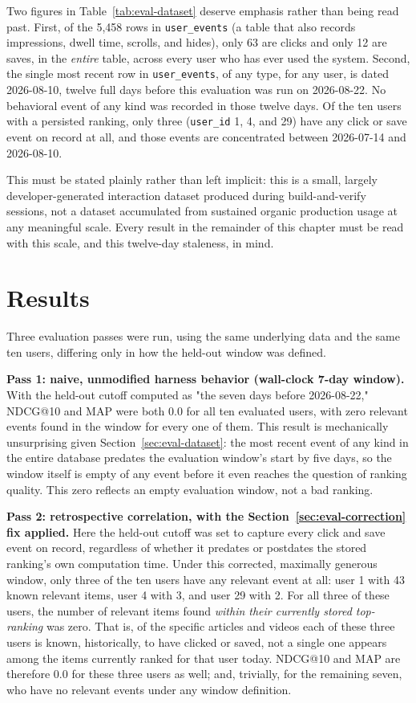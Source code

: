 Two figures in Table~\ref{tab:eval-dataset} deserve emphasis rather than being read past. First, of the 5,458 rows in \texttt{user\_events} (a table that also records impressions, dwell time, scrolls, and hides), only 63 are clicks and only 12 are saves, in the \emph{entire} table, across every user who has ever used the system. Second, the single most recent row in \texttt{user\_events}, of any type, for any user, is dated 2026-08-10, twelve full days before this evaluation was run on 2026-08-22. No behavioral event of any kind was recorded in those twelve days. Of the ten users with a persisted ranking, only three (\texttt{user\_id} 1, 4, and 29) have any click or save event on record at all, and those events are concentrated between 2026-07-14 and 2026-08-10.

This must be stated plainly rather than left implicit: this is a small, largely developer-generated interaction dataset produced during build-and-verify sessions, not a dataset accumulated from sustained organic production usage at any meaningful scale. Every result in the remainder of this chapter must be read with this scale, and this twelve-day staleness, in mind.

\section{Results}
\label{sec:eval-results}

Three evaluation passes were run, using the same underlying data and the same ten users, differing only in how the held-out window was defined.

\textbf{Pass 1: naive, unmodified harness behavior (wall-clock 7-day window).} With the held-out cutoff computed as "the seven days before 2026-08-22," NDCG@10 and MAP were both $0.0$ for all ten evaluated users, with zero relevant events found in the window for every one of them. This result is mechanically unsurprising given Section~\ref{sec:eval-dataset}: the most recent event of any kind in the entire database predates the evaluation window's start by five days, so the window itself is empty of any event before it even reaches the question of ranking quality. This zero reflects an empty evaluation window, not a bad ranking.

\textbf{Pass 2: retrospective correlation, with the Section~\ref{sec:eval-correction} fix applied.} Here the held-out cutoff was set to capture every click and save event on record, regardless of whether it predates or postdates the stored ranking's own computation time. Under this corrected, maximally generous window, only three of the ten users have any relevant event at all: user 1 with 43 known relevant items, user 4 with 3, and user 29 with 2. For all three of these users, the number of relevant items found \emph{within their currently stored top-ranking} was zero. That is, of the specific articles and videos each of these three users is known, historically, to have clicked or saved, not a single one appears among the items currently ranked for that user today. NDCG@10 and MAP are therefore $0.0$ for these three users as well; and, trivially, for the remaining seven, who have no relevant events under any window definition.

